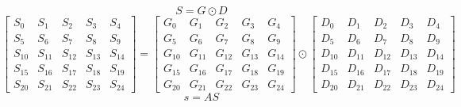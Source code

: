 \documentclass{article}%
\begin{document}
\[%
S = G \odot D%
\]%
\[%
\left[\begin{matrix}S_{0} & S_{1} & S_{2} & S_{3} & S_{4}\\S_{5} & S_{6} & S_{7} & S_{8} & S_{9}\\S_{10} & S_{11} & S_{12} & S_{13} & S_{14}\\S_{15} & S_{16} & S_{17} & S_{18} & S_{19}\\S_{20} & S_{21} & S_{22} & S_{23} & S_{24}\end{matrix}\right] = \left[\begin{matrix}G_{0} & G_{1} & G_{2} & G_{3} & G_{4}\\G_{5} & G_{6} & G_{7} & G_{8} & G_{9}\\G_{10} & G_{11} & G_{12} & G_{13} & G_{14}\\G_{15} & G_{16} & G_{17} & G_{18} & G_{19}\\G_{20} & G_{21} & G_{22} & G_{23} & G_{24}\end{matrix}\right] \odot \left[\begin{matrix}D_{0} & D_{1} & D_{2} & D_{3} & D_{4}\\D_{5} & D_{6} & D_{7} & D_{8} & D_{9}\\D_{10} & D_{11} & D_{12} & D_{13} & D_{14}\\D_{15} & D_{16} & D_{17} & D_{18} & D_{19}\\D_{20} & D_{21} & D_{22} & D_{23} & D_{24}\end{matrix}\right]%
\]%
\[%
s = AS%
\]%
\end{document}
